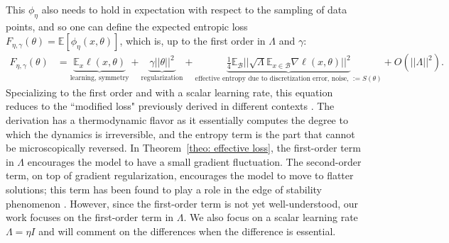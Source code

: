 \documentclass{article}
\theoremstyle{plain}
\newcommand{\E}{\mathbb{E}}
\begin{document}
This $\phi_\eta$ also needs to hold in expectation with respect to the sampling of data points, and so one can define the expected entropic loss $F_{\eta,\gamma}(\theta) = \E[\phi_\eta(x, \theta)]$, 
which is, up to the first order in $\Lambda$ and $\gamma$:
\begin{align}
\label{eq: free energy}
F_{\eta,\gamma}(\theta)&=\underbrace{\mathbb{E}_x\ell(x,\theta)}_{\text{learning, symmetry}}+\underbrace{\gamma||\theta||^2}_{\text{regularization}} +\underbrace{\frac{1}{4}\mathbb{E}_\mathcal{B}||\sqrt{\Lambda}\mathbb{E}_{x\in\mathcal{B}}  \nabla \ell(x,\theta)||^2 }_{\text{effective entropy due to discretization error, noise, $:=S(\theta)$}} +  O(||\Lambda||^2).
\end{align}
Specializing to the first order and with a scalar learning rate, this equation reduces to the ``modified loss" previously derived in different contexts \cite{barrett2020implicit, smith2021origin, dandi2022implicit}. The derivation has a thermodynamic flavor as it essentially computes the degree to which the dynamics is irreversible, and the entropy term is the part that cannot be microscopically reversed. In Theorem~\ref{theo: effective loss}, the first-order term in $\Lambda$ encourages the model to have a small gradient fluctuation. The second-order term, on top of gradient regularization, encourages the model to move to flatter solutions; this term has been found to play a role in the edge of stability phenomenon \cite{cohen2024understanding}. However, since the first-order term is not yet well-understood, our work focuses on the first-order term in $\Lambda$. We also focus on a scalar learning rate $\Lambda =\eta I$ and will comment on the differences when the difference is essential. 
\end{document}
